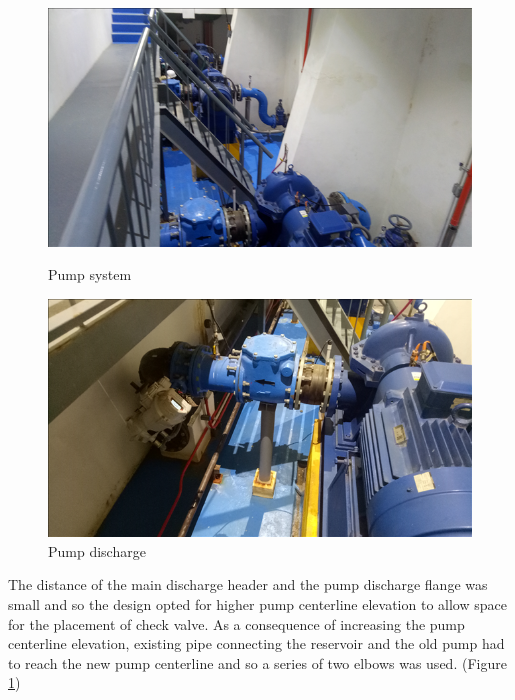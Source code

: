 \begin{figure}[!htb]
	\begin{minipage}[b]{0.5\linewidth}
		\centering
		\includegraphics[width=\textwidth]{figures/ch043_pump_layout_actual}
		\caption{Pump system}
		\label{ch043_pump_layout_actual}
	\end{minipage}
	\hspace{0.05cm}
	\begin{minipage}[b]{0.5\linewidth}
		\centering
		\includegraphics[width=\textwidth]{figures/ch043_pump_discharge}
		\caption{Pump discharge}
		\label{ch043_pump_discharge}
	\end{minipage}
\end{figure}



The distance of the main discharge header and the pump discharge flange was small and so the design opted for higher pump centerline elevation to allow space for the placement of check valve. As a consequence of increasing the pump centerline elevation, existing pipe connecting the reservoir and the old pump had to reach the new pump centerline and so a series of two elbows was used. (Figure \ref{ch043_pump_discharge})


